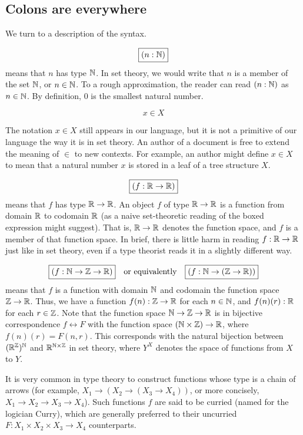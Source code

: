 \documentclass[12pt]{article}
\numberwithin{definition}{section}
\begin{document}
\subsection{Colons are everywhere}

We turn to a description of the syntax.

\[
\boxed{(n : {\mathbb N})}
\]
means that $n$ has type ${\mathbb N}$.  In set theory, we would write that
$n$ is a member of the set ${\mathbb N}$, or $n \in {\mathbb N}$.  To a rough
approximation, the reader can read $(n : {\mathbb N})$ as $n\in {\mathbb N}$.
By definition, $0$ is the smallest natural number.

\[
\boxed{x\in X}
\]

The notation $x\in X$ still appears in our language, but it is not a
primitive of our language the way it is in set theory.  An author of a
document is free to extend the meaning of $\in$ to new contexts.  For
example, an author might define $x\in X$ to mean that a natural number $x$
is stored in a leaf of a tree structure $X$.

\[
\boxed{(f : {\mathbb R} \to {\mathbb R})}
\]
means that $f$ has type ${\mathbb R}\to{\mathbb R}$.  An object $f$ of type
${\mathbb R}\to{\mathbb R}$ is a function from domain ${\mathbb R}$ to codomain ${\mathbb R}$
(as a naive set-theoretic reading of the boxed expression might
suggest).  That is, ${\mathbb R}\to{\mathbb R}$ denotes the function space, and
$f$ is a member of that function space.  In brief, there
is little harm in reading $f :{\mathbb R}\to{\mathbb R}$ just like in set theory,
even if a type theorist reads it in a slightly different way.

\[
\boxed{(f : {\mathbb N} \to{\mathbb Z} \to {\mathbb R})}\quad \text{or equivalently}\quad \boxed{(f:{\mathbb N}\to({\mathbb Z}\to{\mathbb R}))}
\]
means that $f$ is a function with domain ${\mathbb N}$ and codomain the
function space ${\mathbb Z}\to{\mathbb R}$.  Thus, we have a function
$f(n):{\mathbb Z}\to{\mathbb R}$ for each $n\in {\mathbb N}$, and $f(n)(r):{\mathbb R}$ for each
$r\in{\mathbb Z}$.  Note that the function space ${\mathbb N}\to{\mathbb Z}\to{\mathbb R}$ is in
bijective correspondence $f\leftrightarrow F$ with the function space
$({\mathbb N}\times {\mathbb Z})\to{\mathbb R}$, where $f(n)(r) = F(n,r)$. This
corresponds with the natural bijection between $({\mathbb R}^{{\mathbb Z}})^{{\mathbb N}}$
and ${\mathbb R}^{{\mathbb N}\times{\mathbb Z}}$ in set theory, where $Y^X$ denotes the space
of functions from $X$ to $Y$.


It is very common in type theory to construct functions whose type is
a chain of arrows (for example, $X_1\to (X_2\to (X_3 \to X_4))$, or
more concisely, $X_1\to X_2\to X_3 \to X_4$).  Such functions $f$ are
said to be curried (named for the logician Curry), which are generally
preferred to their uncurried $F:X_1\times X_2\times X_3\to X_4$
counterparts.
\end{document}
